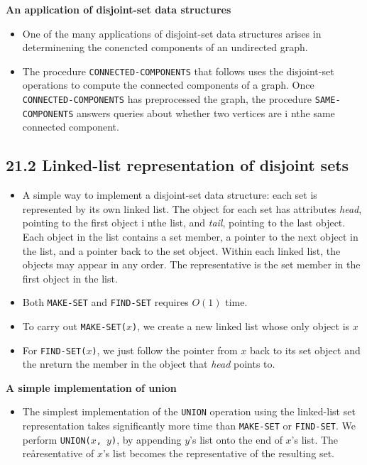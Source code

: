 \documentclass{report}
\begin{document}
\textbf{An application of disjoint-set data structures}
\begin{itemize}
    \item One of the many applications of disjoint-set data structures arises in determinening the conencted components of an undirected graph.
    \item The procedure \texttt{CONNECTED-COMPONENTS} that follows uses the disjoint-set operations to compute the connected components of a graph. Once \texttt{CONNECTED-COMPONENTS} has preprocessed the graph, the procedure \texttt{SAME-COMPONENTS} answers queries about whether two vertices are i nthe same connected component.
\end{itemize}

\subsection*{21.2 Linked-list representation of disjoint sets}
\begin{itemize}
    \item A simple way to implement a disjoint-set data structure: each set is represented by its own linked list. The object for each set has attributes \textit{head}, pointing to the first object i nthe list, and \textit{tail}, pointing to the last object. Each object in the list contains a set member, a pointer to the next object in the list, and a pointer back to the set object. Within each linked list, the objects may appear in any order. The representative is the set member in the first object in the list.
    \item Both \texttt{MAKE-SET} and \texttt{FIND-SET} requires $O(1)$ time.
    \item To carry out \texttt{MAKE-SET($x$)}, we create a new linked list whose only object is $x$
    \item For \texttt{FIND-SET($x$)}, we just follow the pointer from $x$ back to its set object and the nreturn the member in the object that \textit{head} points to.
\end{itemize}
\textbf{A simple implementation of union}
\begin{itemize}
    \item The simplest implementation of the \texttt{UNION} operation using the linked-list set representation takes significantly more time than \texttt{MAKE-SET} or \texttt{FIND-SET}. We perform \texttt{UNION($x$, $y$)}, by appending $y$'s list onto the end of $x$'s list. The reåresentative of $x$'s list becomes the representative of the resulting set.
\end{itemize}
\end{document}
